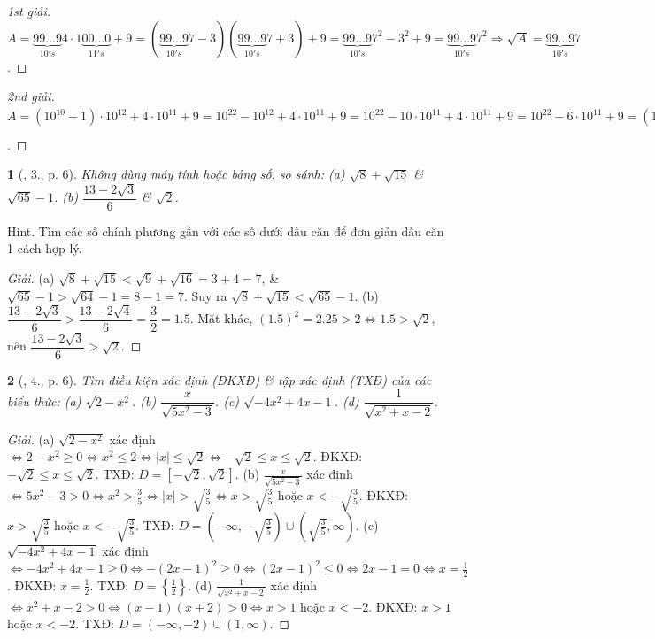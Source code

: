 \documentclass{article}
\newtheorem{baitoan}{}
\begin{document}
\begin{proof}[1st giải]
	$A = \underbrace{99\ldots9}_{10's}4\cdot1\underbrace{00\ldots0}_{11's} + 9 = (\underbrace{99\ldots9}_{10's}7 - 3)(\underbrace{99\ldots9}_{10's}7 + 3) + 9 = \underbrace{99\ldots9}_{10's}7^2 - 3^2 + 9 = \underbrace{99\ldots9}_{10's}7^2\Rightarrow\sqrt{A} = \underbrace{99\ldots9}_{10's}7$.
\end{proof}

\begin{proof}[2nd giải]
	$A = (10^{10} - 1)\cdot10^{12} + 4\cdot10^{11} + 9 = 10^{22} - 10^{12} + 4\cdot10^{11} + 9 = 10^{22} - 10\cdot10^{11} + 4\cdot10^{11} + 9 = 10^{22} - 6\cdot10^{11} + 9 = (10^{11} - 3)^2\Rightarrow\sqrt{A} = 10^{11} - 3 = \underbrace{99\ldots9}_{10's}7$.
\end{proof}

\begin{baitoan}[\cite{Tuyen_Toan_9_old}, 3., p. 6]
	Không dùng máy tính hoặc bảng số, so sánh: (a) $\sqrt{8} + \sqrt{15}$ \& $\sqrt{65} - 1$. (b) $\dfrac{13 - 2\sqrt{3}}{6}$ \& $\sqrt{2}$.
\end{baitoan}
\noindent\textsf{Hint.} Tìm các số chính phương gần với các số dưới dấu căn để đơn giản dấu căn 1 cách hợp lý. 

\begin{proof}[Giải]
	(a) $\sqrt{8} + \sqrt{15} < \sqrt{9} + \sqrt{16} = 3 + 4 = 7$, \& $\sqrt{65} - 1 > \sqrt{64} - 1 = 8 - 1 = 7$. Suy ra $\sqrt{8} + \sqrt{15} < \sqrt{65} - 1$. (b) $\dfrac{13 - 2\sqrt{3}}{6} > \dfrac{13 - 2\sqrt{4}}{6} = \dfrac{3}{2} = 1.5$. Mặt khác, $(1.5)^2 = 2.25 > 2\Leftrightarrow 1.5 > \sqrt{2}$, nên $\dfrac{13 - 2\sqrt{3}}{6} > \sqrt{2}$.
\end{proof}

\begin{baitoan}[\cite{Tuyen_Toan_9_old}, 4., p. 6]
	Tìm điều kiện xác định (ĐKXĐ) \& tập xác định (TXĐ) của các biểu thức: (a) $\sqrt{2 - x^2}$. (b) $\dfrac{x}{\sqrt{5x^2 - 3}}$. (c) $\sqrt{-4x^2 + 4x - 1}$. (d) $\dfrac{1}{\sqrt{x^2 + x - 2}}$.
\end{baitoan}

\begin{proof}[Giải]
	(a) $\sqrt{2 - x^2}$ xác định $\Leftrightarrow2 - x^2\ge0\Leftrightarrow x^2\le2\Leftrightarrow|x|\le\sqrt{2}\Leftrightarrow-\sqrt{2}\le x\le\sqrt{2}$. ĐKXĐ: $-\sqrt{2}\le x\le\sqrt{2}$. TXĐ: $D = [-\sqrt{2},\sqrt{2}]$. (b) $\frac{x}{\sqrt{5x^2 - 3}}$ xác định $\Leftrightarrow 5x^2 - 3 > 0\Leftrightarrow x^2 > \frac{3}{5}\Leftrightarrow|x| > \sqrt{\frac{3}{5}}\Leftrightarrow x > \sqrt{\frac{3}{5}}$ hoặc $x < -\sqrt{\frac{3}{5}}$. ĐKXĐ: $x > \sqrt{\frac{3}{5}}$ hoặc $x < -\sqrt{\frac{3}{5}}$. TXĐ: $D = \left(-\infty,-\sqrt{\frac{3}{5}}\right)\cup\left(\sqrt{\frac{3}{5}},\infty\right)$. (c) $\sqrt{-4x^2 + 4x - 1}$ xác định $\Leftrightarrow-4x^2 + 4x - 1\ge0\Leftrightarrow-(2x - 1)^2\ge0\Leftrightarrow(2x - 1)^2\le0\Leftrightarrow2x - 1 = 0\Leftrightarrow x = \frac{1}{2}$. ĐKXĐ: $x = \frac{1}{2}$. TXĐ: $D = \left\{\frac{1}{2}\right\}$. (d) $\frac{1}{\sqrt{x^2 + x - 2}}$ xác định $\Leftrightarrow x^2 + x - 2 > 0\Leftrightarrow(x - 1)(x + 2) > 0\Leftrightarrow x > 1$ hoặc $x < -2$. ĐKXĐ: $x > 1$ hoặc $x < -2$. TXĐ: $D = (-\infty,-2)\cup(1,\infty)$.
\end{proof}
\end{document}
